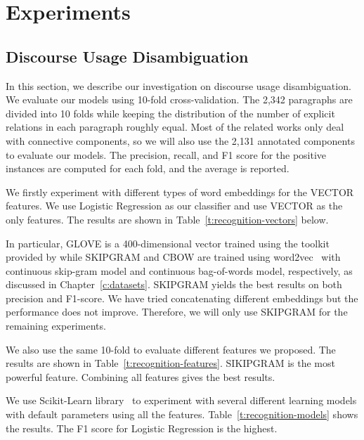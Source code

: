%
%
%
\chapter{Experiments}
\label{c:exp}

\section{Discourse Usage Disambiguation}
\label{s:discourse-usage-exp}

In this section, we describe our investigation
on discourse usage disambiguation. We evaluate our models using
10-fold cross-validation. The 2,342 paragraphs are divided  into 10 folds
while keeping the distribution of the number of explicit relations
in each paragraph roughly equal. Most of the related works only
deal with connective components, so we will also use the 2,131 annotated
components to evaluate our models.
The precision, recall, and F1 score for the positive instances are computed
for each fold, and the average is reported.


We firstly experiment with different types of word embeddings for
the VECTOR features. We use Logistic Regression as our classifier
and use VECTOR as the only features. The results are
shown in Table~\ref{t:recognition-vectors} below. 



In particular, GLOVE is a 400-dimensional vector trained using the
toolkit provided by \cite{pennington2014glove} while SKIPGRAM and
CBOW are trained using word2vec~\citep{mikolov2013efficient} with
continuous skip-gram model and continuous bag-of-words model,
respectively, as discussed in Chapter~\ref{c:datasets}. SKIPGRAM
yields the best results on both precision and F1-score. We have
tried concatenating different embeddings but the performance does not
improve. Therefore, we will only use SKIPGRAM for the remaining experiments.

We also use the same 10-fold to evaluate different features we proposed.
The results are shown in Table~\ref{t:recognition-features}. SIKIPGRAM
is the most powerful feature. Combining all features gives the best
results.



We use Scikit-Learn library~\citep{scikit-learn} to experiment with
several different learning models with default parameters using all the features.
Table~\ref{t:recognition-models} shows the results. The F1 score for Logistic
Regression is the highest.



